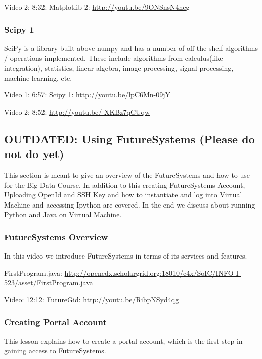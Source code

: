 Video 2: 8:32: Matplotlib 2: \url{http://youtu.be/9ONSnsN4hcg}

\subsubsection{Scipy 1}\label{scipy-1}

SciPy is a library built above numpy and has a number of off the shelf
algorithms / operations implemented. These include algorithms from
calculus(like integration), statistics, linear algebra,
image-processing, signal processing, machine learning, etc.

Video 1: 6:57: Scipy 1: \url{http://youtu.be/lpC6Mn-09jY}

Video 2: 8:52: \url{http://youtu.be/-XKBz7qCUqw}

\subsection{OUTDATED: Using FutureSystems (Please do not do
yet)}\label{outdated-using-futuresystems-please-do-not-do-yet}

This section is meant to give an overview of the FutureSystems and how
to use for the Big Data Course. In addition to this creating
FutureSystems Account, Uploading OpenId and SSH Key and how to
instantiate and log into Virtual Machine and accessing Ipython are
covered. In the end we discuss about running Python and Java on Virtual
Machine.

\subsubsection{FutureSystems Overview}\label{futuresystems-overview}

In this video we introduce FutureSystems in terms of its services and
features.

FirstProgram.java:
\url{http://openedx.scholargrid.org:18010/c4x/SoIC/INFO-I-523/asset/FirstProgram.java}

Video: 12:12: FutureGid: \url{http://youtu.be/RibpNSyd4qg}

\subsubsection{Creating Portal Account}\label{creating-portal-account}

This lesson explains how to create a portal account, which is the first
step in gaining access to FutureSystems.

